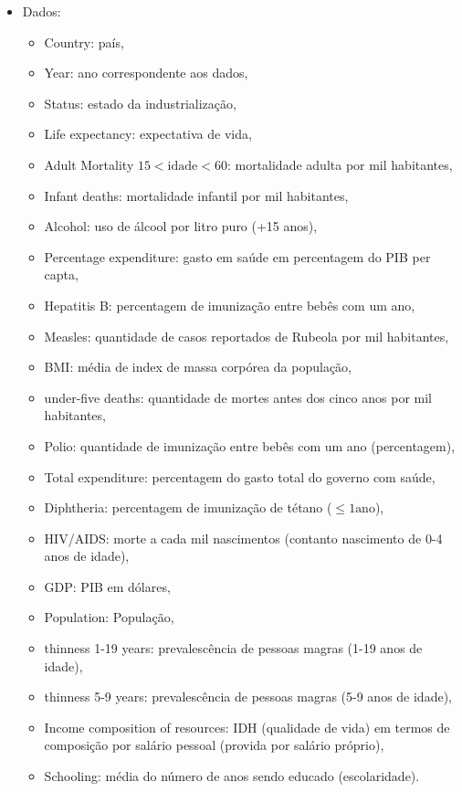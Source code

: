 \documentclass[12pt]{abntex2}
\begin{document}
\begin{itemize}
\item Dados:
\begin{itemize}
\item Country: país,
\item Year: ano correspondente aos dados,
\item Status: estado da industrialização,
\item Life expectancy: expectativa de vida,
\item Adult Mortality \(15<\text{idade}<60\): mortalidade adulta por mil habitantes,
\item Infant deaths: mortalidade infantil por mil habitantes,
\item Alcohol: uso de álcool por litro puro (+15 anos),
\item Percentage expenditure: gasto em saúde em percentagem do PIB per capta,
\item Hepatitis B: percentagem de imunização entre bebês com um ano,
\item Measles: quantidade de casos reportados de Rubeola por mil habitantes,
\item BMI: média de index de massa corpórea da população,
\item under-five deaths: quantidade de mortes antes dos cinco anos por mil habitantes,
\item Polio: quantidade de imunização entre bebês com um ano (percentagem),
\item Total expenditure: percentagem do gasto total do governo com saúde,
\item Diphtheria: percentagem de imunização de tétano (\(\leq 1 \text{ano}\)),
\item HIV/AIDS: morte a cada mil nascimentos (contanto nascimento de 0-4 anos de idade),
\item GDP: PIB em dólares,
\item Population: População,
\item thinness  1-19 years: prevalescência de pessoas magras (1-19 anos de idade),
\item thinness 5-9 years: prevalescência de pessoas magras (5-9 anos de idade),
\item Income composition of resources: IDH (qualidade de vida) em termos de composição por salário pessoal (provida por salário próprio),
\item Schooling: média do número de anos sendo educado (escolaridade).
\end{itemize}
\end{itemize}
\end{document}

